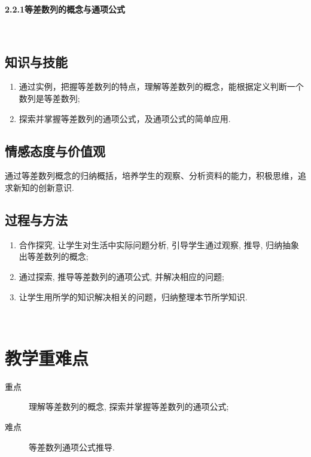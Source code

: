 \documentclass[10pt,a4paper]{article}
\begin{document}
\centerline{\Large{\textbf{2.2.1等差数列的概念与通项公式}}}


　　		\subsection{知识与技能}
			\begin{enumerate}
				\item 通过实例，把握等差数列的特点，理解等差数列的概念，能根据定义判断一个数列是等差数列; 
				\item 探索并掌握等差数列的通项公式，及通项公式的简单应用. 
			\end{enumerate}

		\subsection{情感态度与价值观}
			通过等差数列概念的归纳概括，培养学生的观察、分析资料的能力，积极思维，追求新知的创新意识. 

		\subsection{过程与方法}
			\begin{enumerate}

				\item 合作探究, 让学生对生活中实际问题分析, 引导学生通过观察, 推导, 归纳抽象出等差数列的概念; 

				\item 通过探索, 推导等差数列的通项公式, 并解决相应的问题; 

				\item 让学生用所学的知识解决相关的问题，归纳整理本节所学知识. 

			\end{enumerate}


　　\section{教学重难点}

		\begin{description}

			\item[重点] 理解等差数列的概念, 探索并掌握等差数列的通项公式; 

			\item[难点] 等差数列通项公式推导. 

		\end{description}
\end{document}
